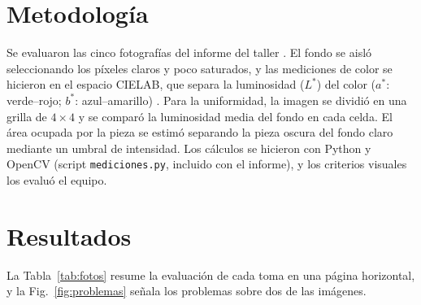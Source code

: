 \documentclass[runningheads]{llncs}
\begin{document}
\section{Metodología}

Se evaluaron las cinco fotografías del informe del taller \cite{forense}. El fondo se aisló seleccionando los píxeles claros y poco saturados, y las mediciones de color se hicieron en el espacio CIELAB, que separa la luminosidad ($L^*$) del color ($a^*$: verde--rojo; $b^*$: azul--amarillo) \cite{gonzalez}. Para la uniformidad, la imagen se dividió en una grilla de $4\times4$ y se comparó la luminosidad media del fondo en cada celda. El área ocupada por la pieza se estimó separando la pieza oscura del fondo claro mediante un umbral de intensidad. Los cálculos se hicieron con Python y OpenCV (script \texttt{mediciones.py}, incluido con el informe), y los criterios visuales los evaluó el equipo.

\section{Resultados}

La Tabla~\ref{tab:fotos} resume la evaluación de cada toma en una página horizontal, y la Fig.~\ref{fig:problemas} señala los problemas sobre dos de las imágenes.
\end{document}
